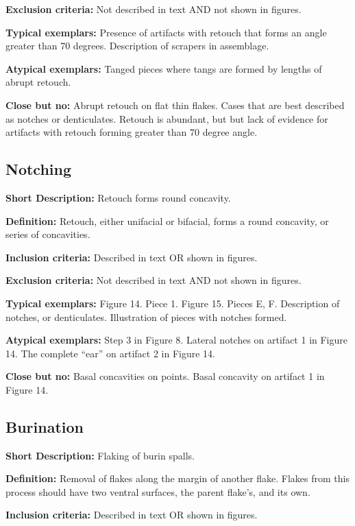 \documentclass[
]{article}
\begin{document}
\textbf{Exclusion criteria:} Not described in text AND not shown in
figures.

\textbf{Typical exemplars:} Presence of artifacts with retouch that
forms an angle greater than 70 degrees. Description of scrapers in
assemblage.

\textbf{Atypical exemplars:} Tanged pieces where tangs are formed by
lengths of abrupt retouch.

\textbf{Close but no:} Abrupt retouch on flat thin flakes. Cases that
are best described as notches or denticulates. Retouch is abundant, but
but lack of evidence for artifacts with retouch forming greater than 70
degree angle.

\hypertarget{notching}{%
\subsection{Notching}\label{notching}}

\textbf{Short Description:} Retouch forms round concavity.

\textbf{Definition:} Retouch, either unifacial or bifacial, forms a
round concavity, or series of concavities.

\textbf{Inclusion criteria:} Described in text OR shown in figures.

\textbf{Exclusion criteria:} Not described in text AND not shown in
figures.

\textbf{Typical exemplars:} Figure 14. Piece 1. Figure 15. Pieces E, F.
Description of notches, or denticulates. Illustration of pieces with
notches formed.

\textbf{Atypical exemplars:} Step 3 in Figure 8. Lateral notches on
artifact 1 in Figure 14. The complete ``ear'' on artifact 2 in Figure
14.

\textbf{Close but no:} Basal concavities on points. Basal concavity on
artifact 1 in Figure 14.

\hypertarget{burination}{%
\subsection{Burination}\label{burination}}

\textbf{Short Description:} Flaking of burin spalls.

\textbf{Definition:} Removal of flakes along the margin of another
flake. Flakes from this process should have two ventral surfaces, the
parent flake's, and its own.

\textbf{Inclusion criteria:} Described in text OR shown in figures.
\end{document}
